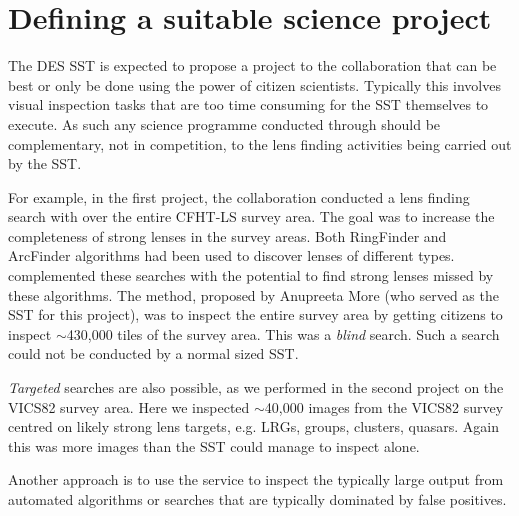 \documentclass[a4paper,twocolumn]{article}
\begin{document}


\section{Defining a suitable \sw science project}
\label{sec:project}

The DES SST is expected to propose a project to the \sw collaboration that can be best or only be done using the power of citizen scientists. Typically this involves visual inspection tasks that are too time consuming for the SST themselves to execute. As such any science programme conducted through \sw should be complementary, not in competition, to the lens finding activities being carried out by the SST.

For example, in the first \sw project, the \sw collaboration conducted a lens finding search with \sw over the entire CFHT-LS survey area. The goal was to increase the completeness of strong lenses in the survey areas. Both RingFinder and ArcFinder algorithms had been used to discover lenses of different types. \sw complemented these searches with the potential to find strong lenses missed by these algorithms. The method, proposed by Anupreeta More (who served as the SST for this project), was to inspect the entire survey area by getting citizens to inspect $\sim$430,000 tiles of the survey area. This was a \textit{blind} search. Such a search could not be conducted by a normal sized SST.

\textit{Targeted} searches are also possible, as we performed in the second \sw project on the VICS82 survey area. Here we inspected $\sim$40,000 images from the VICS82 survey centred on likely strong lens targets, e.g. LRGs, groups, clusters, quasars.  Again this was more images than the SST could manage to inspect alone.

Another approach is to use the \sw service to inspect the typically large output from automated algorithms or searches that are typically dominated by false positives.
\end{document}
